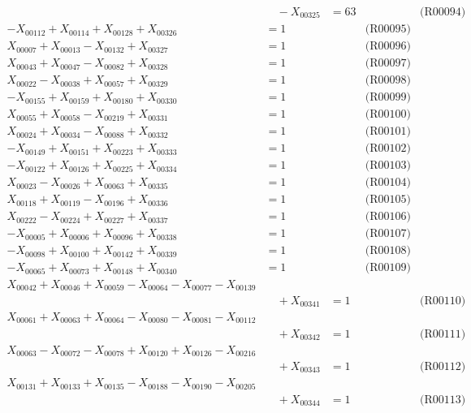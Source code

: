 \documentclass[a4paper,10pt]{article}
\begin{document}
{\begin{align}
&\quad  - X_{00325} &= 63 && \text{(R00094)} \\
-X_{00112} + X_{00114} + X_{00128} + X_{00326} &= 1 && \text{(R00095)} \\
X_{00007} + X_{00013} - X_{00132} + X_{00327} &= 1 && \text{(R00096)} \\
X_{00043} + X_{00047} - X_{00082} + X_{00328} &= 1 && \text{(R00097)} \\
X_{00022} - X_{00038} + X_{00057} + X_{00329} &= 1 && \text{(R00098)} \\
-X_{00155} + X_{00159} + X_{00180} + X_{00330} &= 1 && \text{(R00099)} \\
X_{00055} + X_{00058} - X_{00219} + X_{00331} &= 1 && \text{(R00100)} \\
\allowbreak
X_{00024} + X_{00034} - X_{00088} + X_{00332} &= 1 && \text{(R00101)} \\
-X_{00149} + X_{00151} + X_{00223} + X_{00333} &= 1 && \text{(R00102)} \\
-X_{00122} + X_{00126} + X_{00225} + X_{00334} &= 1 && \text{(R00103)} \\
X_{00023} - X_{00026} + X_{00063} + X_{00335} &= 1 && \text{(R00104)} \\
X_{00118} + X_{00119} - X_{00196} + X_{00336} &= 1 && \text{(R00105)} \\
X_{00222} - X_{00224} + X_{00227} + X_{00337} &= 1 && \text{(R00106)} \\
-X_{00005} + X_{00006} + X_{00096} + X_{00338} &= 1 && \text{(R00107)} \\
-X_{00098} + X_{00100} + X_{00142} + X_{00339} &= 1 && \text{(R00108)} \\
-X_{00065} + X_{00073} + X_{00148} + X_{00340} &= 1 && \text{(R00109)} \\
X_{00042} + X_{00046} + X_{00059} - X_{00064} - X_{00077} - X_{00139} \\[0.5ex]
&\quad  + X_{00341} &= 1 && \text{(R00110)} \\
X_{00061} + X_{00063} + X_{00064} - X_{00080} - X_{00081} - X_{00112} \\[0.5ex]
&\quad  + X_{00342} &= 1 && \text{(R00111)} \\
X_{00063} - X_{00072} - X_{00078} + X_{00120} + X_{00126} - X_{00216} \\[0.5ex]
&\quad  + X_{00343} &= 1 && \text{(R00112)} \\
X_{00131} + X_{00133} + X_{00135} - X_{00188} - X_{00190} - X_{00205} \\[0.5ex]
&\quad  + X_{00344} &= 1 && \text{(R00113)} \\

\end{align}}
\end{document}
